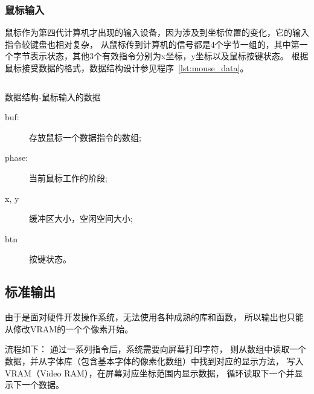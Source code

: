 
\subsubsection{鼠标输入}

鼠标作为第四代计算机才出现的输入设备，因为涉及到坐标位置的变化，它的输入指令较键盘也相对复杂，
从鼠标传到计算机的信号都是4个字节一组的，其中第一个字节表示状态，其他3个有效指令分别为x坐标，y坐标以及鼠标按键状态。
根据鼠标接受数据的格式，数据结构设计参见程序~\ref{lst:mouse_data}。

\begin{listing}[H]
  \inputminted[tabsize=2, firstline=126, lastline=129,
    linenos=true]{c}{../ZOS/src/kernel/bootpack.h}
  \caption{数据结构-鼠标输入的数据}
  \label{lst:mouse_data}
\end{listing}
\begin{description}
\item[buf:]存放鼠标一个数据指令的数组;
\item[phase:]当前鼠标工作的阶段;
\item[x, y]缓冲区大小，空闲空间大小;
\item[btn]按键状态。
\end{description}


\subsection{标准输出}

由于是面对硬件开发操作系统，无法使用各种成熟的库和函数，
所以输出也只能从修改VRAM的一个个像素开始。

流程如下：
通过一系列指令后，系统需要向屏幕打印字符，
则从数组中读取一个数据，并从字体库（包含基本字体的像素化数组）中找到对应的显示方法，
写入VRAM（Video RAM），在屏幕对应坐标范围内显示数据，
循环读取下一个并显示下一个数据。